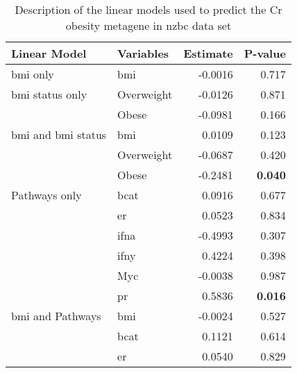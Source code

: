 \begin{table}[htpb]
	\centering
	\caption{Description of the linear models used to predict the Cr obesity metagene in \gls{nzbc} data set}
	\label{tab:lm_sig_var}
	\begin{threeparttable}
		\begin{tabular}{llrr}
			Linear Model & Variables & Estimate & P-value\\
			\hline
			\hline
			\rule{0pt}{2.25ex}\gls{bmi} only                           & \gls{bmi}  & -0.0016 & 0.717\\
			\hline
			\rule{0pt}{2.25ex}\gls{bmi} status only                    & Overweight & -0.0126 & 0.871\\
                                                                       & Obese      & -0.0981 & 0.166\\
			\hline
			\rule{0pt}{2.25ex}\gls{bmi} and \gls{bmi} status           & \gls{bmi}  & 0.0109  & 0.123\\
                                                                       & Overweight & -0.0687 & 0.420\\
                                                                       & Obese      & -0.2481 & \textbf{0.040}\tnote{1}\\
			\hline
			\rule{0pt}{2.25ex}Pathways only                            & \gls{bcat} & 0.0916  & 0.677\\
                                                                       & \gls{er}   & 0.0523  & 0.834\\
                                                                       & \gls{ifna} & -0.4993 & 0.307\\
                                                                       & \gls{ifny} & 0.4224  & 0.398\\
                                                                       & Myc        & -0.0038 & 0.987\\
                                                                       & \gls{pr}   & 0.5836  & \textbf{0.016}\\
			\hline
			\rule{0pt}{2.25ex}\gls{bmi} and Pathways                   & \gls{bmi}  & -0.0024 & 0.527\\
                                                                       & \gls{bcat} & 0.1121  & 0.614\\
                                                                       & \gls{er}   & 0.0540  & 0.829\\

\end{tabular}
\end{threeparttable}
\end{table}
